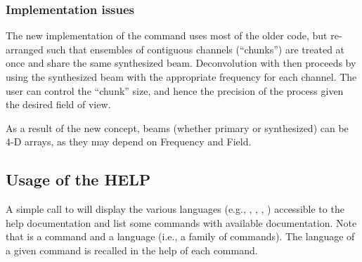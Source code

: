 \subsubsection{Implementation issues}

The new implementation of the  command uses most of the 
older code, but re-arranged such that ensembles of contiguous channels 
(``chunks'') are treated at once and share the same synthesized beam. 
Deconvolution with  then proceeds by using the synthesized 
beam with the appropriate frequency for each channel. The user can 
control the ``chunk'' size, and hence the precision of the process 
given the desired field of view.

As a result of the new concept, beams (whether primary or synthesized) 
can be 4-D arrays, as they may depend on Frequency and Field.

% 
% 
% 

\subsection{Usage of the HELP}

A simple call to  will display the various languages (e.g., 
, , , ) accessible to 
the help documentation and list some commands with available 
documentation. Note that  is a command and  a language 
(i.e., a family of commands). The language of a given command is 
recalled in the help of each command. 

